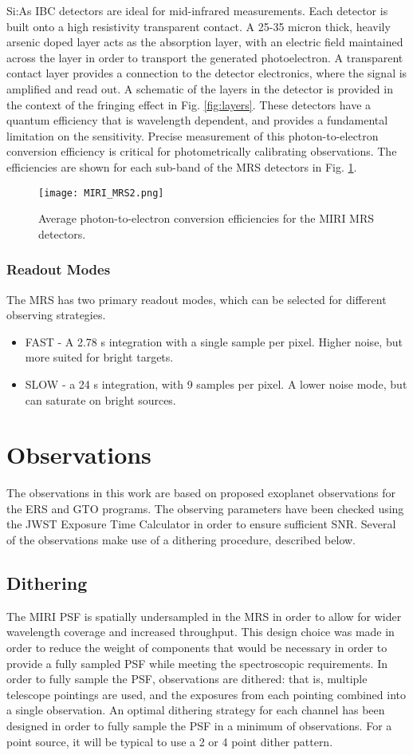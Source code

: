 Si:As IBC detectors are ideal for mid-infrared measurements.
Each detector is built onto a high resistivity transparent contact. 
A 25-35 micron thick, heavily arsenic doped layer acts as the absorption layer, with an electric field maintained across the layer in order to transport the generated photoelectron.
A transparent contact layer provides a connection to the detector electronics, where the signal is amplified and read out.
A schematic of the layers in the detector is provided in the context of the fringing effect in Fig. \ref{fig:layers}.
These detectors have a quantum efficiency that is wavelength dependent, and provides a fundamental limitation on the sensitivity.
Precise measurement of this photon-to-electron conversion efficiency is critical for photometrically calibrating observations. 
The efficiencies are shown for each sub-band of the MRS detectors in Fig. \ref{fig:mirideteff}.
\begin{figure}[t]
	\texttt{[image: MIRI\_MRS2.png]}
	\caption{Average photon-to-electron conversion efficiencies for the MIRI MRS detectors.}
	\label{fig:mirideteff}
\end{figure}
\subsubsection{Readout Modes}
The MRS has two primary readout modes, which can be selected for different observing strategies.
\begin{itemize}
	\item FAST - A 2.78 s integration with a single sample per pixel. Higher noise, but more suited for bright targets.
	\item SLOW - a 24 s integration, with 9 samples per pixel. A lower noise mode, but can saturate on bright sources.
\end{itemize}

\section{Observations}
The observations in this work are based on proposed exoplanet observations for the ERS and GTO programs.
The observing parameters have been checked using the JWST Exposure Time Calculator in order to ensure sufficient SNR.
Several of the observations make use of a dithering procedure, described below.
\subsection{Dithering}
The MIRI PSF is spatially undersampled in the MRS in order to allow for wider wavelength coverage and increased throughput.
This design choice was made in order to reduce the weight of components that would be necessary in order to provide a fully sampled PSF while meeting the spectroscopic requirements.
In order to fully sample the PSF, observations are dithered: that is, multiple telescope pointings are used, and the exposures from each pointing combined into a single observation.
An optimal dithering strategy for each channel has been designed in order to fully sample the PSF in a minimum of observations. 
For a point source, it will be typical to use a 2 or 4 point dither pattern.

